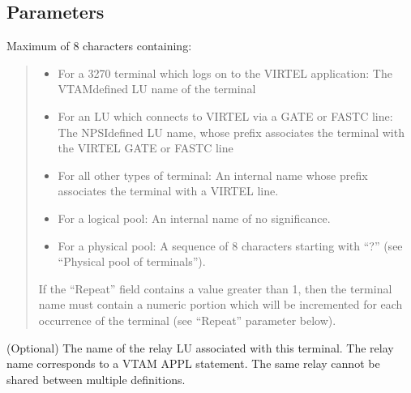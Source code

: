 \documentclass[letterpaper,10pt,english]{sphinxmanual}
\begin{document}
\subsection{Parameters}
\label{\detokenize{connectivity_guide:index-100}}\label{\detokenize{connectivity_guide:id53}}\begin{description}
\sphinxAtStartPar
Maximum of 8 characters containing:
\begin{quote}
\begin{itemize}
\item {} 
\sphinxAtStartPar
For a 3270 terminal which logs on to the VIRTEL application: The VTAM\sphinxhyphen{}defined LU name of the terminal

\item {} 
\sphinxAtStartPar
For an LU which connects to VIRTEL via a GATE or FASTC line: The NPSI\sphinxhyphen{}defined LU name, whose prefix associates the terminal with the VIRTEL GATE or FASTC line

\item {} 
\sphinxAtStartPar
For all other types of terminal: An internal name whose prefix associates the terminal with a VIRTEL line.

\item {} 
\sphinxAtStartPar
For a logical pool: An internal name of no significance.

\item {} 
\sphinxAtStartPar
For a physical pool: A sequence of 8 characters starting with “?” (see “Physical pool of terminals”).

\end{itemize}

\sphinxAtStartPar
If the “Repeat” field contains a value greater than 1, then the terminal name must contain a numeric portion which will be incremented for each occurrence of the terminal (see “Repeat” parameter below).
\end{quote}

\sphinxAtStartPar
(Optional) The name of the relay LU associated with this terminal. The relay name corresponds to a VTAM APPL statement. The same relay cannot be shared between multiple definitions.


\end{description}
\end{document}
